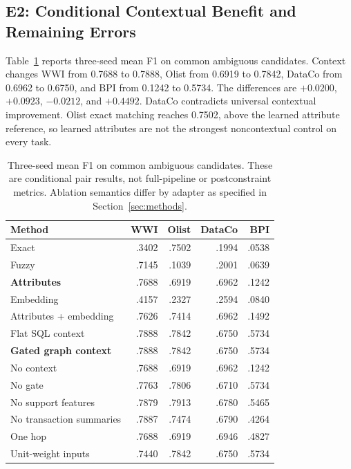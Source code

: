 \documentclass[conference,letterpaper]{IEEEtran}
\begin{document}
\subsection{E2: Conditional Contextual Benefit and Remaining Errors}
Table~\ref{tab:matching} reports three-seed mean F1 on common ambiguous candidates. Context changes WWI from 0.7688 to 0.7888, Olist from 0.6919 to 0.7842, DataCo from 0.6962 to 0.6750, and BPI from 0.1242 to 0.5734. The differences are $+0.0200$, $+0.0923$, $-0.0212$, and $+0.4492$. DataCo contradicts universal contextual improvement. Olist exact matching reaches 0.7502, above the learned attribute reference, so learned attributes are not the strongest noncontextual control on every task.

\begin{table}[t]
\caption{Three-seed mean F1 on common ambiguous candidates. These are conditional pair results, not full-pipeline or postconstraint metrics. Ablation semantics differ by adapter as specified in Section~\ref{sec:methods}.}
\label{tab:matching}
\centering
\small
\setlength{\tabcolsep}{3.4pt}
\begin{tabular}{lrrrr}
\toprule
Method & WWI & Olist & DataCo & BPI\\
\midrule
Exact & .3402 & .7502 & .1994 & .0538\\
Fuzzy & .7145 & .1039 & .2001 & .0639\\
\textbf{Attributes} & .7688 & .6919 & .6962 & .1242\\
Embedding & .4157 & .2327 & .2594 & .0840\\
Attributes + embedding & .7626 & .7414 & .6962 & .1492\\
Flat SQL context & .7888 & .7842 & .6750 & .5734\\
\textbf{Gated graph context} & .7888 & .7842 & .6750 & .5734\\
\midrule
No context & .7688 & .6919 & .6962 & .1242\\
No gate & .7763 & .7806 & .6710 & .5734\\
No support features & .7879 & .7913 & .6780 & .5465\\
No transaction summaries & .7887 & .7474 & .6790 & .4264\\
One hop & .7688 & .6919 & .6946 & .4827\\
Unit-weight inputs & .7440 & .7842 & .6750 & .5734\\
\bottomrule
\end{tabular}
\end{table}
\end{document}
